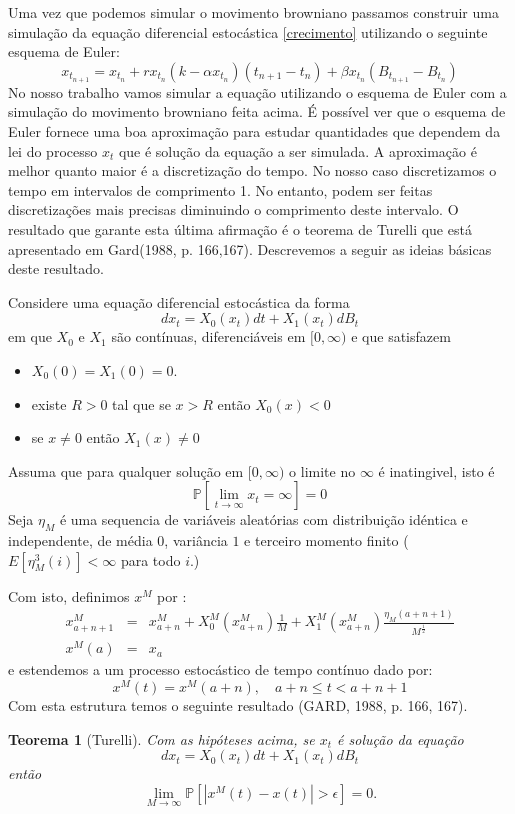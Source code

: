 \documentclass[12pt]{article}
\newtheorem{teo}{Teorema}%
\begin{document}
Uma vez que podemos simular o movimento browniano passamos  construir uma simulação da equação diferencial  estocástica \ref{crecimento} utilizando o seguinte esquema de Euler:
\[
x_{t_{n+1}}=x_{t_n}+rx_{t_n}(k-\alpha x_{t_n})(t_{n+1}-t_{n})+\beta x_{t_n}(B_{t_{n+1}}-B_{t_n})
\]
No nosso trabalho vamos simular a equação utilizando o esquema de Euler com a simulação do movimento browniano feita acima. É possível ver que o esquema de Euler fornece uma boa aproximação para estudar quantidades que dependem da lei do processo $x_t$ que é solução da equação a ser simulada. A aproximação é melhor quanto maior é a  discretização do tempo. No nosso caso discretizamos o tempo em intervalos de comprimento 1. No entanto, podem ser feitas discretizações mais precisas diminuindo o comprimento deste intervalo. O resultado que garante esta última afirmação é o teorema de Turelli que está apresentado em Gard(1988, p. 166,167). Descrevemos a seguir as ideias básicas deste resultado. 

Considere uma equação diferencial estocástica da forma 
\[dx_t = X_0(x_t)dt + X_1(x_t)dB_t\] em que  $X_0$ e $X_1$ são contínuas, diferenciáveis em $[0, \infty)$ e que satisfazem
\begin{itemize}
\item $X_0(0) = X_1(0) = 0.$
\item existe $R>0$ tal que se $x>R$ então $X_0(x)<0$
\item se $x\neq 0$ então $X_1(x)\neq 0$
\end{itemize} 
Assuma que para qualquer solução em $[0, \infty)$ o limite no $\infty$ é inatingivel, isto é 
\[
\mathbb{P}\left[\lim_{t\rightarrow\infty}x_t=\infty\right]=0
\] 
Seja $ \eta_M $ é uma sequencia de variáveis aleatórias com distribuição idéntica e independente, de média $0$, variância $1$ e terceiro momento finito ($E[\eta_M^3(i)] < \infty$ para todo $i$.)

Com isto, definimos  $x^M$  por :
\begin{eqnarray*}
x^M_{a+n+1}&=& x^M_{a+n} +  X_0^M(x^M_{a+n})\frac{1}{M} + X_1^M(x^M_{a+n})\frac{\eta_M(a+n+1)}{M^{\frac{1}{2}}}\\
x^M(a)&=& x_a
\end{eqnarray*}
e estendemos a um  processo estocástico  de tempo contínuo dado por:
\[
x^M(t) = x^M(a+n),\quad  a+n \leq t<a+n+1
\]
Com esta estrutura temos o seguinte resultado (GARD, 1988, p. 166, 167).
\begin{teo}[Turelli]
Com as hipóteses acima, se $x_t$ é solução da equação 
\[dx_t = X_0(x_t)dt + X_1(x_t)dB_t\] então 
\[
\lim_{M\rightarrow\infty}\mathbb{P}\left[|x^M(t)-x(t)|>\epsilon\right]=0.
\]

\end{teo}
 
\end{document}
